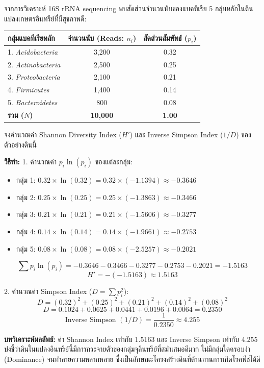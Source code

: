 \begin{worked}
จากการวิเคราะห์ 16S rRNA sequencing พบสัดส่วนจำนวนนับของแบคทีเรีย 5 กลุ่มหลักในดินแปลงเกษตรอินทรีย์ที่มีสุขภาพดี:
\begin{center}
\small
\begin{tabular}{lcc}
\toprule
\textbf{กลุ่มแบคทีเรียหลัก} & \textbf{จำนวนนับ (Reads: $n_i$)} & \textbf{สัดส่วนสัมพัทธ์ ($p_i$)} \\
\midrule
1. \textit{Acidobacteria} & 3,200 & 0.32 \\
2. \textit{Actinobacteria} & 2,500 & 0.25 \\
3. \textit{Proteobacteria} & 2,100 & 0.21 \\
4. \textit{Firmicutes} & 1,400 & 0.14 \\
5. \textit{Bacteroidetes} & 800 & 0.08 \\
\midrule
\textbf{รวม ($N$)} & \textbf{10,000} & \textbf{1.00} \\
\bottomrule
\end{tabular}
\end{center}

จงคำนวณค่า Shannon Diversity Index ($H'$) และ Inverse Simpson Index ($1/D$) ของตัวอย่างดินนี้

\textbf{วิธีทำ:}
1. คำนวณค่า $p_i \ln(p_i)$ ของแต่ละกลุ่ม:
\begin{itemize}
    \item กลุ่ม 1: $0.32 \times \ln(0.32) = 0.32 \times (-1.1394) \approx -0.3646$
    \item กลุ่ม 2: $0.25 \times \ln(0.25) = 0.25 \times (-1.3863) \approx -0.3466$
    \item กลุ่ม 3: $0.21 \times \ln(0.21) = 0.21 \times (-1.5606) \approx -0.3277$
    \item กลุ่ม 4: $0.14 \times \ln(0.14) = 0.14 \times (-1.9661) \approx -0.2753$
    \item กลุ่ม 5: $0.08 \times \ln(0.08) = 0.08 \times (-2.5257) \approx -0.2021$
\end{itemize}
$$\sum p_i \ln(p_i) = -0.3646 - 0.3466 - 0.3277 - 0.2753 - 0.2021 = -1.5163$$
$$H' = -(-1.5163) \approx 1.5163$$

2. คำนวณค่า Simpson Index ($D = \sum p_i^2$):
$$D = (0.32)^2 + (0.25)^2 + (0.21)^2 + (0.14)^2 + (0.08)^2$$
$$D = 0.1024 + 0.0625 + 0.0441 + 0.0196 + 0.0064 = 0.2350$$
$$\text{Inverse Simpson } (1/D) = \frac{1}{0.2350} \approx 4.255$$

\textbf{บทวิเคราะห์ผลลัพธ์:} ค่า Shannon Index เท่ากับ 1.5163 และ Inverse Simpson เท่ากับ 4.255 บ่งชี้ว่าดินในแปลงอินทรีย์นี้มีการกระจายตัวของกลุ่มจุลินทรีย์ที่สม่ำเสมอดีมาก ไม่มีกลุ่มใดครอบงำ (Dominance) จนทำลายความหลากหลาย ซึ่งเป็นลักษณะโครงสร้างดินที่ต้านทานการเกิดโรคพืชได้ดี
\end{worked}

